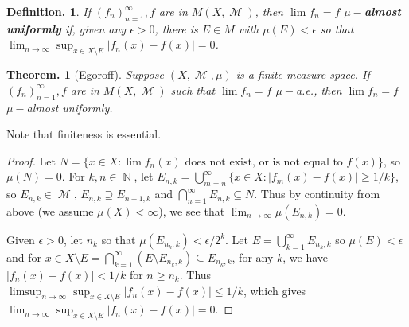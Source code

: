 \documentclass[11pt, a4paper]{memoir}
\DeclareMathOperator{\N}{{\mathbb{N}}}
\theoremstyle{change}
\newtheorem{theorem}{Theorem.}[section]
\theoremstyle{plain}
\theoremstyle{nonumberplain}
\newtheorem{definition}{Definition.}
\newtheorem{proof}{Proof}
\DeclareMathOperator{\M}{{\mathcal{M}}}
\begin{document}
\begin{definition}
    If $(f_n)_{n=1}^\infty,f$ are in $M(X,\M)$, then $\lim f_n=f$ \textbf{$\mu-$almost uniformly} if, given any $\epsilon>0$, there is $E\in M$ with $\mu(E)<\epsilon$ so that $\lim_{n\to\infty}\sup_{x\in X\setminus E}|f_n(x)-f(x)|=0$.
\end{definition}
\begin{theorem}[Egoroff]
    Suppose $(X,\M,\mu)$ is a finite measure space.
    If $(f_n)_{n=1}^\infty,f$ are in $M(X,\M)$ such that $\lim f_n=f$ $\mu-$a.e., then $\lim f_n=f$ $\mu-$almost uniformly.
\end{theorem}
Note that finiteness is essential.
\begin{proof}
    Let $N=\{x\in X:\lim f_n(x)\text{ does not exist, or is not equal to $f(x)$}\}$, so $\mu(N)=0$.
    For $k,n\in\N$, let $E_{n,k}=\bigcup_{m=n}^\infty\{x\in X:|f_m(x)-f(x)|\geq 1/k\}$, so $E_{n,k}\in\M$, $E_{n,k}\supseteq E_{n+1,k}$ and $\bigcap_{n=1}^\infty E_{n,k}\subseteq N$.
    Thus by continuity from above (we assume $\mu(X)<\infty$), we see that $\lim_{n\to\infty}\mu(E_{n,k})=0$.

    Given $\epsilon>0$, let $n_k$ so that $\mu(E_{n_k,k})<\epsilon/2^k$.
    Let $E=\bigcup_{k=1}^\infty E_{n_k,k}$ so $\mu(E)<\epsilon$ and for $x\in X\setminus E=\bigcap_{k=1}^\infty(E\setminus E_{n_k,k})\subseteq E_{n_k,k}$, for any $k$, we have $|f_n(x)-f(x)|<1/k$ for $n\geq n_k$.
    Thus $\limsup_{n\to\infty}\sup_{x\in X\setminus E}|f_n(x)-f(x)|\leq 1/k$, which gives $\lim_{n\to\infty}\sup_{x\in X\setminus E}|f_n(x)-f(x)|=0$.
\end{proof}
\end{document}
